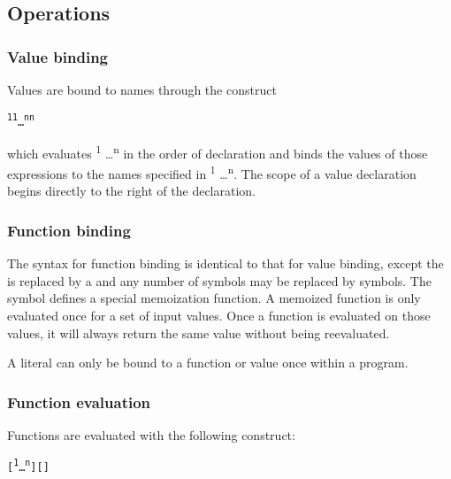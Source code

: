 \subsection{Operations}

\subsubsection{Value binding}

Values are bound to names through the construct 

\begin{alltt}
\quad {}\textsuperscript{1} \term{=} \textsuperscript{1}   \dots {} \textsuperscript{n} \term{=} \textsuperscript{n}  
\end{alltt}

which evaluates  \textsuperscript{1} \dots  {}\textsuperscript{n} in the order of declaration and binds the values of those expressions to the names specified in \textsuperscript{1} \dots {}\textsuperscript{n}. The scope of a value declaration begins directly to the right of the declaration.

\subsubsection{Function binding}

The syntax for function binding is identical to that for value binding, except the  is replaced by  a  and any number of \term{=} symbols may be replaced by \term{:=} symbols. The \term{:=} symbol defines a special memoization function. A memoized function is only evaluated once for a set of input values. Once a function is evaluated on those values, it will always return the same value without being reevaluated. 

A literal can only be bound to a function or value once within a program.

\subsubsection{Function evaluation}
Functions are evaluated with the following construct:

\begin{alltt}
\quad \term{\midtilde}  [ \textsuperscript{1} \dots {}\textsuperscript{n} ] [   ] 
\end{alltt}

